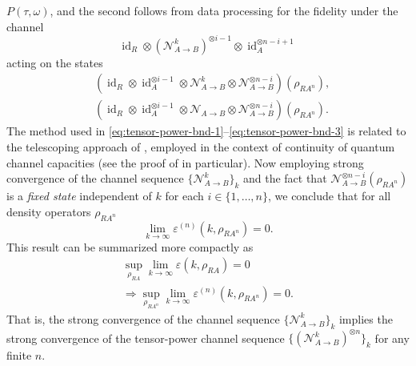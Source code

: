 \documentclass[apsrev,twocolumn]{revtex4-1}%
\begin{document}
$P(\tau,\omega)$, and the second follows from data processing for the fidelity
under the channel%
\begin{equation}
\operatorname{id}_{R}\otimes(\mathcal{N}_{A\rightarrow B}^{k})^{\otimes
i-1}\otimes\operatorname{id}_{A}^{\otimes n-i+1}%
\end{equation}
acting on the states%
\begin{align}
&  (\operatorname{id}_{R}\otimes\operatorname{id}_{A}^{\otimes i-1}%
\otimes\mathcal{N}_{A\rightarrow B}^{k}\otimes\mathcal{N}_{A\rightarrow
B}^{\otimes n-i})(\rho_{RA^{n}}),\\
&  (\operatorname{id}_{R}\otimes\operatorname{id}_{A}^{\otimes i-1}%
\otimes\mathcal{N}_{A\rightarrow B}\otimes\mathcal{N}_{A\rightarrow
B}^{\otimes n-i})(\rho_{RA^{n}}).
\end{align}
The method used in
\eqref{eq:tensor-power-bnd-1}--\eqref{eq:tensor-power-bnd-3} is related to the
telescoping approach of \cite{LS09}, employed in the context of continuity of
quantum channel capacities (see the proof of \cite[Theorem~11]{LS09} in
particular). Now employing strong convergence of the channel sequence
$\{\mathcal{N}_{A\rightarrow B}^{k}\}_{k}$ and the fact that $\mathcal{N}%
_{A\rightarrow B}^{\otimes n-i}(\rho_{RA^{n}})$ is a \textit{fixed state}
independent of $k$ for each $i\in\{1,\ldots,n\}$, we conclude that for all
density operators $\rho_{RA^{n}}$%
\begin{equation}
\lim_{k\rightarrow\infty}\varepsilon^{(n)}(k,\rho_{RA^{n}})=0.
\end{equation}
This result can be summarized more compactly as%
\begin{multline}
\sup_{\rho_{RA}}\lim_{k\rightarrow\infty}\varepsilon(k,\rho_{RA}%
)=0\label{eq:str-conv-tensor-power}\\
\Longrightarrow\sup_{\rho_{RA^{n}}}\lim_{k\rightarrow\infty}\varepsilon
^{(n)}(k,\rho_{RA^{n}})=0.
\end{multline}
That is, the strong convergence of the channel sequence $\{\mathcal{N}%
_{A\rightarrow B}^{k}\}_{k}$ implies the strong convergence of the
tensor-power channel sequence $\{(\mathcal{N}_{A\rightarrow B}^{k})^{\otimes
n}\}_{k}$ for any finite $n$.
\end{document}

